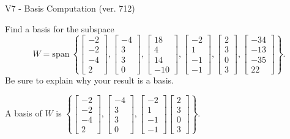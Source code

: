 \begin{exercise}
  \begin{exerciseTitle}V7 - Basis Computation (ver. 712)\end{exerciseTitle}
  \begin{exerciseStatement}
    Find a basis for the subspace 
\[W=\mathrm{span}\ \left\{\left[\begin{array}{r}
-2 \\
-2 \\
-4 \\
2
\end{array}\right] , \left[\begin{array}{r}
-4 \\
3 \\
3 \\
0
\end{array}\right] , \left[\begin{array}{r}
18 \\
4 \\
14 \\
-10
\end{array}\right] , \left[\begin{array}{r}
-2 \\
1 \\
-1 \\
-1
\end{array}\right] , \left[\begin{array}{r}
2 \\
3 \\
0 \\
3
\end{array}\right] , \left[\begin{array}{r}
-34 \\
-13 \\
-35 \\
22
\end{array}\right]\right\}.\]
 Be sure to explain why your result is a basis.


  \end{exerciseStatement}
  \begin{exerciseAnswer}
   A basis of \(W\) is  \(\left\{\left[\begin{array}{r}
-2 \\
-2 \\
-4 \\
2
\end{array}\right] , \left[\begin{array}{r}
-4 \\
3 \\
3 \\
0
\end{array}\right] , \left[\begin{array}{r}
-2 \\
1 \\
-1 \\
-1
\end{array}\right] \left[\begin{array}{r}
2 \\
3 \\
0 \\
3
\end{array}\right]\right\}\).
  


  \end{exerciseAnswer}
\end{exercise}